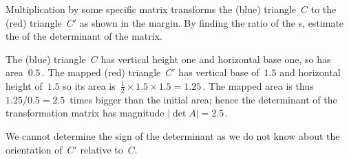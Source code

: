 \begin{example} \label{eg:}
Multiplication by some specific matrix transforms the (blue) triangle~\(C\) to the (red) triangle~\(C'\) as shown in the margin.  By finding the ratio of the s, estimate the  of the determinant of the matrix.
\begin{solution} 
The (blue) triangle~\(C\) has vertical height one and horizontal base one, so has area~\(0.5\)\,.
The mapped (red) triangle~\(C'\) has vertical base of~\(1.5\) and horizontal height of~\(1.5\) so its area is~\(\frac12\times1.5\times1.5=1.25\)\,.
The mapped area is thus \(1.25/0.5=2.5\)~times bigger than the initial area; hence the determinant of the transformation matrix has magnitude \(|\det A|=2.5\)\,.

We cannot determine the sign of the determinant as we do not know about the orientation of~\(C'\) relative to~\(C\).
\end{solution}
\end{example}



